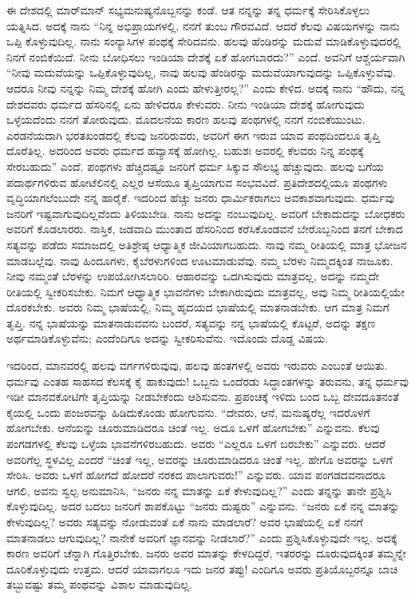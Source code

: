 ಈ ದೇಶದಲ್ಲಿ ಮಾರ್​ಮಾನ್​ ಸಭ್ಯಮನುಷ್ಯನೊಬ್ಬನನ್ನು ಕಂಡೆ. ಆತ ನನ್ನನ್ನು ತನ್ನ ಧರ್ಮಕ್ಕೆ ಸೇರಿಸಿಕೊಳ್ಳಲು ಯತ್ನಿಸಿದ. ಅದಕ್ಕೆ ನಾನು “ನಿನ್ನ ಅಭಿಪ್ರಾಯಗಳಲ್ಲಿ, ನನಗೆ ತುಂಬ ಗೌರವವಿದೆ. ಆದರೆ ಕೆಲವು ವಿಷಯಗಳನ್ನು ನಾನು ಒಪ್ಪಿ ಕೊಳ್ಳುವುದಿಲ್ಲ. ನಾನು ಸಂನ್ಯಾಸಿಗಳ ಪಂಥಕ್ಕೆ ಸೇರಿದವನು. ಹಲವು ಹೆಂಡಿರನ್ನು ಮದುವೆ ಮಾಡಿಕೊಳ್ಳುವುದರಲ್ಲಿ ನಿನಗೆ ನಂಬಿಕೆಯಿದೆ. ನೀನು ಬೋಧಿಸಲು ಇಂಡಿಯಾ ದೇಶಕ್ಕೆ ಏಕೆ ಹೋಗಬಾರದು?” ಎಂದೆ. ಅವನಿಗೆ ಆಶ್ಚರ್ಯವಾಗಿ “ನೀವು ಮದುವೆಯನ್ನು ಒಪ್ಪಿಕೊಳ್ಳುವುದಿಲ್ಲ, ನಾವು ಹಲವು ಹೆಂಡಿರನ್ನು ಮದುವೆಯಾಗುವುದನ್ನು ಒಪ್ಪಿಕೊಳ್ಳುವೆವು. ಆದರೂ ನೀವು ನನ್ನನ್ನು ನಿಮ್ಮ ದೇಶಕ್ಕೆ ಹೋಗಿ ಎಂದು ಹೇಳುತ್ತೀರಲ್ಲ?” ಎಂದು ಕೇಳಿದ. ಅದಕ್ಕೆ ನಾನು “ಹೌದು, ನನ್ನ ದೇಶದವರು ಧರ್ಮದ ಹೆಸರಿನಲ್ಲಿ ಏನು ಹೇಳಿದರೂ ಕೇಳುವರು. ನೀನು ಇಂಡಿಯಾ ದೇಶಕ್ಕೆ ಹೋಗುವುದು ಒಳ್ಳೆಯದೆಂದು ನನಗೆ ತೋರುವುದು. ಮೊದಲನೆಯ ಕಾರಣ ಹಲವು ಪಂಥಗಳಲ್ಲಿ ನನಗೆ ನಂಬಿಕೆಯುಂಟು. ಎರಡನೆಯದಾಗಿ ಭರತಖಂಡದಲ್ಲಿ ಕೆಲವು ಜನರಿರುವರು, ಅವರಿಗೆ ಈಗ ಇರುವ ಯಾವ ಪಂಥದಿಂದಲೂ ತೃಪ್ತಿ ದೊರೆತಿಲ್ಲ. ಅದರಿಂದ ಅವರು ಧರ್ಮದ ಹವ್ಯಾಸಕ್ಕೆ ಹೋಗಿಲ್ಲ. ಬಹುಶಃ ಅವರಲ್ಲಿ ಕೆಲವರು ನಿನ್ನ ಪಂಥಕ್ಕೆ ಸೇರಬಹುದು” ಎಂದೆ. ಪಂಥಗಳು ಹೆಚ್ಚಿದಷ್ಟೂ ಜನರಿಗೆ ಧರ್ಮ ಸಿಕ್ಕುವ ಸೌಲಭ್ಯ ಹೆಚ್ಚುವುದು. ಹಲವು ಬಗೆಯ ಪದಾರ್ಥಗಳಿರುವ ಹೋಟೆಲಿನಲ್ಲಿ ಎಲ್ಲರ ಆಸೆಯೂ ತೃಪ್ತಿಯಾಗುವ ಸಂಭವವಿದೆ. ಪ್ರತಿದೇಶದಲ್ಲಿಯೂ ಪಂಥಗಳು ವೃದ್ಧಿಯಾಗಲೆಂಬುದೇ ನನ್ನ ಹಾರೈಕೆ. ಇದರಿಂದ ಹೆಚ್ಚು ಜನರು ಧಾರ್ಮಿಕರಾಗಲು ಅವಕಾಶವಾಗುವುದು. ಧರ್ಮವು ಜನರಿಗೆ ಇಷ್ಟವಾಗುವುದಿಲ್ಲವೆಂದು ತಿಳಿಯಬೇಡಿ. ನಾನು ಅದನ್ನು ನಂಬುವುದಿಲ್ಲ. ಅವರಿಗೆ ಬೇಕಾದುದನ್ನು ಬೋಧಕರು ಅವರಿಗೆ ಕೊಡಲಾರರು. ನಾಸ್ತಿಕ, ಜಡವಾದಿ ಮುಂತಾದ ಹೆಸರಿನಿಂದ ಕರೆಸಿಕೊಂಡವನೆ ಬೇರೊಬ್ಬನಿಂದ ತನಗೆ ಬೇಕಾದ ಸತ್ಯವನ್ನು ಪಡೆದು ಸಮಾಜದಲ್ಲಿ ಅತಿಶ್ರೇಷ್ಠ ಆಧ್ಯಾತ್ಮಿಕ ಜೀವಿಯಾಗಬಹುದು. ನಾವು ನಮ್ಮ ರೀತಿಯಲ್ಲಿ ಮಾತ್ರ ಭೋಜನ ಮಾಡಬಲ್ಲೆವು. ನಾವು ಹಿಂದೂಗಳು, ಕೈಬೆರಳುಗಳಿಂದ ಊಟಮಾಡುವೆವು. ನಮ್ಮ ಬೆರಳು ನಿಮ್ಮದಕ್ಕಿಂತ ನಾಜೂಕು. ನೀವು ನಮ್ಮಂತೆ ಬೆರಳನ್ನು ಉಪಯೋಗಿಸಲಾರಿರಿ. ಆಹಾರವನ್ನು ಒದಗಿಸುವುದು ಮಾತ್ರವಲ್ಲ, ಅದನ್ನು ನಮ್ಮದೇ ರೀತಿಯಲ್ಲಿ ಸ್ವೀಕರಿಸಬೇಕು. ನಿಮಗೆ ಆಧ್ಯಾತ್ಮಿಕ ಭಾವನೆಗಳು ಬೇಕಾಗಿರುವುದು ಮಾತ್ರವಲ್ಲ, ಅವು ನಿಮ್ಮ ರೀತಿಯಲ್ಲಿಯೇ ದೊರಕಬೇಕು. ಅವರು ನಿಮ್ಮ ಭಾಷೆಯಲ್ಲಿ, ನಿಮ್ಮ ಹೃದಯದ ಭಾಷೆಯಲ್ಲಿ ಮಾತನಾಡಬೇಕು. ಆಗ ಮಾತ್ರ ನಿಮಗೆ ತೃಪ್ತಿ. ನನ್ನ ಭಾಷೆಯನ್ನು ಮಾತನಾಡುವವನು ಬಂದರೆ, ಸತ್ಯವನ್ನು ನನ್ನ ಭಾಷೆಯಲ್ಲಿ ಕೊಟ್ಟರೆ, ಅದನ್ನು ತಕ್ಷಣ ಅರ್ಥಮಾಡಿಕೊಳ್ಳುವೆನು; ಎಂದೆಂದಿಗೂ ಅದನ್ನು ಸ್ವೀಕರಿಸುವೆನು. ಇದೊಂದು ದೊಡ್ಡ ವಿಷಯ.

\vskip 5pt

ಇದರಿಂದ, ಮಾನವರಲ್ಲಿ ಹಲವು ವರ್ಗಗಳಿರುವುವು, ಹಲವು ಹಂತಗಳಲ್ಲಿ ಅವರು ಇರುವರು ಎಂಬಂತೆ ಆಯಿತು. ಧರ್ಮವು ಎಂತಹ ಸಾಹಸದ ಕೆಲಸಕ್ಕೆ ಕೈ ಹಾಕುವುದು! ಒಬ್ಬನು ಒಂದೆರಡು ಸಿದ್ಧಾಂತಗಳನ್ನು ತರುವನು, ತನ್ನ ಧರ್ಮವು ಇಡೀ ಮಾನವಕೋಟಿಗೇ ತೃಪ್ತಿಯನ್ನು ನೀಡಬೇಕೆಂದು ಆಶಿಸುವನು. ಪ್ರಪಂಚಕ್ಕೆ ಇಳಿದು ಬಂದ ಒಬ್ಬ ದೇವದೂತನಂತೆ ಕೈಯಲ್ಲಿ ಒಂದು ಪಂಜರವನ್ನು ಹಿಡಿದುಕೊಂಡು ಹೋಗುವನು. “ದೇವರು, ಆನೆ, ಮನುಷ್ಯರೆಲ್ಲ ಇದರೊಳಗೆ ಹೋಗಬೇಕು. ಆನೆಯನ್ನು ಚೂರುಮಾಡಿದರೂ ಚಿಂತೆ ಇಲ್ಲ. ಅದೂ ಒಳಗೆ ಹೋಗಬೇಕು” ಎನ್ನುವನು. ಕೆಲವು ಪಂಗಡಗಳಲ್ಲಿ ಕೆಲವು ಒಳ್ಳೆಯ ಭಾವನೆಗಳಿರಬಹುದು. ಅವರು “ಎಲ್ಲರೂ ಒಳಗೆ ಬರಬೇಕು” ಎನ್ನುವರು. ಆದರೆ ಅವರಿಗೆಲ್ಲ ಸ್ಥಳವಿಲ್ಲ ಎಂದರೆ “ಚಿಂತೆ ಇಲ್ಲ, ಅವರನ್ನು ಚೂರುಮಾಡಿದರೂ ಚಿಂತೆ ಇಲ್ಲ. ಹೇಗೊ ಅವರನ್ನು ಒಳಗೆ ಸೇರಿಸಿ. ಅವರು ಒಳಗೆ ಹೋಗದೆ ಹೋದರೆ ನರಕದ ಪಾಲಾಗುವರು!” ಎನ್ನುವರು. ಯಾವ ಪಂಗಡದವನಾದರೂ ಆಗಲಿ, ಅವನು ಸ್ವಲ್ಪ ಅನುಮಾನಿಸಿ, “ಜನರು ನನ್ನ ಮಾತನ್ನು ಏಕೆ ಕೇಳುವುದಿಲ್ಲ?” ಎಂದು ತನ್ನನ್ನು ತಾನೇ ಪ್ರಶ್ನಿಸಿ ಕೊಳ್ಳುವುದಿಲ್ಲ. ಅದರ ಬದಲು ಜನರಿಗೆ ಶಾಪಕೊಟ್ಟು “ಜನರು ದುಷ್ಟರು” ಎನ್ನುವನು. “ಜನರು ಏಕೆ ನನ್ನ ಮಾತನ್ನು ಕೇಳುವುದಿಲ್ಲ? ಅವರು ಸತ್ಯವನ್ನು ನೋಡುವಂತೆ ಏಕೆ ನಾನು ಮಾಡಲಾರೆ? ಅವರ ಭಾಷೆಯಲ್ಲಿ ಏಕೆ ನನಗೆ ಮಾತನಾಡಲು ಆಗುವುದಿಲ್ಲ? ನಾನೇಕೆ ಅವರಿಗೆ ಜ್ಞಾನವನ್ನು ನೀಡಲಾರೆ?” ಎಂದು ಪ್ರಶ್ನಿಸಿಕೊಳ್ಳುವುದೇ ಇಲ್ಲ. ಅದಕ್ಕೆ ಕಾರಣ ಅವರಿಗೆ ಚೆನ್ನಾಗಿ ಗೊತ್ತಿರ\break ಬೇಕು. ಜನರು ಅವರ ಮಾತನ್ನು ಕೇಳದಿದ್ದರೆ, ಇತರರನ್ನು ದೂರುವುದಕ್ಕಿಂತ ತಮ್ಮನ್ನೇ ದೂರಿಕೊಳ್ಳುವುದು ಉತ್ತಮ. ಆದರೆ ಯಾವಾಗಲೂ ಇದು ಜನರ ತಪ್ಪು! ಎಂದಿಗೂ ಅವರು ಪ್ರತಿಯೊಬ್ಬರನ್ನೂ ಬಾಚಿ ತಬ್ಬುವಷ್ಟು ತಮ್ಮ ಪಂಥವನ್ನು ವಿಶಾಲ ಮಾಡುವುದಿಲ್ಲ.

